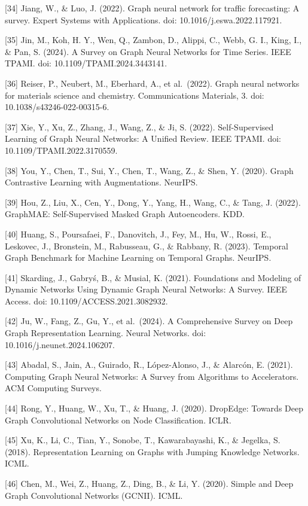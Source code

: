 {[}34{]} Jiang, W., \& Luo, J. (2022). Graph neural network for traffic forecasting: A survey. Expert Systems with Applications. doi: 10.1016/j.eswa.2022.117921.

{[}35{]} Jin, M., Koh, H. Y., Wen, Q., Zambon, D., Alippi, C., Webb, G. I., King, I., \& Pan, S. (2024). A Survey on Graph Neural Networks for Time Series. IEEE TPAMI. doi: 10.1109/TPAMI.2024.3443141.

{[}36{]} Reiser, P., Neubert, M., Eberhard, A., et al.~(2022). Graph neural networks for materials science and chemistry. Communications Materials, 3. doi: 10.1038/s43246-022-00315-6.

{[}37{]} Xie, Y., Xu, Z., Zhang, J., Wang, Z., \& Ji, S. (2022). Self-Supervised Learning of Graph Neural Networks: A Unified Review. IEEE TPAMI. doi: 10.1109/TPAMI.2022.3170559.

{[}38{]} You, Y., Chen, T., Sui, Y., Chen, T., Wang, Z., \& Shen, Y. (2020). Graph Contrastive Learning with Augmentations. NeurIPS.

{[}39{]} Hou, Z., Liu, X., Cen, Y., Dong, Y., Yang, H., Wang, C., \& Tang, J. (2022). GraphMAE: Self-Supervised Masked Graph Autoencoders. KDD.

{[}40{]} Huang, S., Poursafaei, F., Danovitch, J., Fey, M., Hu, W., Rossi, E., Leskovec, J., Bronstein, M., Rabusseau, G., \& Rabbany, R. (2023). Temporal Graph Benchmark for Machine Learning on Temporal Graphs. NeurIPS.

{[}41{]} Skarding, J., Gabryś, B., \& Musial, K. (2021). Foundations and Modeling of Dynamic Networks Using Dynamic Graph Neural Networks: A Survey. IEEE Access. doi: 10.1109/ACCESS.2021.3082932.

{[}42{]} Ju, W., Fang, Z., Gu, Y., et al.~(2024). A Comprehensive Survey on Deep Graph Representation Learning. Neural Networks. doi: 10.1016/j.neunet.2024.106207.

{[}43{]} Abadal, S., Jain, A., Guirado, R., López-Alonso, J., \& Alarcón, E. (2021). Computing Graph Neural Networks: A Survey from Algorithms to Accelerators. ACM Computing Surveys.

{[}44{]} Rong, Y., Huang, W., Xu, T., \& Huang, J. (2020). DropEdge: Towards Deep Graph Convolutional Networks on Node Classification. ICLR.

{[}45{]} Xu, K., Li, C., Tian, Y., Sonobe, T., Kawarabayashi, K., \& Jegelka, S. (2018). Representation Learning on Graphs with Jumping Knowledge Networks. ICML.

{[}46{]} Chen, M., Wei, Z., Huang, Z., Ding, B., \& Li, Y. (2020). Simple and Deep Graph Convolutional Networks (GCNII). ICML.

